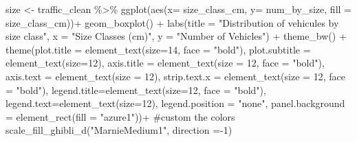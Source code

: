 \documentclass[
  10pt,
  letterpaper,
]{article}
\newenvironment{Shaded}{\begin{snugshade}}{\end{snugshade}}
\newcommand{\AttributeTok}[1]{\textcolor[rgb]{0.40,0.45,0.13}{#1}}
\newcommand{\CommentTok}[1]{\textcolor[rgb]{0.37,0.37,0.37}{#1}}
\newcommand{\DecValTok}[1]{\textcolor[rgb]{0.68,0.00,0.00}{#1}}
\newcommand{\FunctionTok}[1]{\textcolor[rgb]{0.28,0.35,0.67}{#1}}
\newcommand{\NormalTok}[1]{\textcolor[rgb]{0.00,0.23,0.31}{#1}}
\newcommand{\OtherTok}[1]{\textcolor[rgb]{0.00,0.23,0.31}{#1}}
\newcommand{\SpecialCharTok}[1]{\textcolor[rgb]{0.37,0.37,0.37}{#1}}
\newcommand{\StringTok}[1]{\textcolor[rgb]{0.13,0.47,0.30}{#1}}
\begin{document}
\begin{Shaded}
\begin{Highlighting}[]
\NormalTok{size }\OtherTok{\textless{}{-}}\NormalTok{ traffic\_clean }\SpecialCharTok{\%\textgreater{}\%} 
  \FunctionTok{ggplot}\NormalTok{(}\FunctionTok{aes}\NormalTok{(}\AttributeTok{x=}\NormalTok{ size\_class\_cm, }\AttributeTok{y=}\NormalTok{ num\_by\_size, }\AttributeTok{fill =}\NormalTok{ size\_class\_cm))}\SpecialCharTok{+}
  \FunctionTok{geom\_boxplot}\NormalTok{() }\SpecialCharTok{+}
  \FunctionTok{labs}\NormalTok{(}\AttributeTok{title =} \StringTok{"Distribution of vehicules by size class"}\NormalTok{,}
       \AttributeTok{x =} \StringTok{"Size Classes (cm)"}\NormalTok{,}
       \AttributeTok{y =} \StringTok{"Number of Vehicles"}\NormalTok{) }\SpecialCharTok{+}
  \FunctionTok{theme\_bw}\NormalTok{() }\SpecialCharTok{+} 
  \FunctionTok{theme}\NormalTok{(}\AttributeTok{plot.title =} \FunctionTok{element\_text}\NormalTok{(}\AttributeTok{size=}\DecValTok{14}\NormalTok{, }\AttributeTok{face =} \StringTok{"bold"}\NormalTok{), }
        \AttributeTok{plot.subtitle =} \FunctionTok{element\_text}\NormalTok{(}\AttributeTok{size=}\DecValTok{12}\NormalTok{),}
        \AttributeTok{axis.title =} \FunctionTok{element\_text}\NormalTok{(}\AttributeTok{size =} \DecValTok{12}\NormalTok{, }\AttributeTok{face =} \StringTok{"bold"}\NormalTok{),}
        \AttributeTok{axis.text =} \FunctionTok{element\_text}\NormalTok{(}\AttributeTok{size =} \DecValTok{12}\NormalTok{),}
        \AttributeTok{strip.text.x =} \FunctionTok{element\_text}\NormalTok{(}\AttributeTok{size =} \DecValTok{12}\NormalTok{, }\AttributeTok{face =} \StringTok{"bold"}\NormalTok{),}
        \AttributeTok{legend.title=}\FunctionTok{element\_text}\NormalTok{(}\AttributeTok{size=}\DecValTok{12}\NormalTok{, }\AttributeTok{face =} \StringTok{"bold"}\NormalTok{),}
        \AttributeTok{legend.text=}\FunctionTok{element\_text}\NormalTok{(}\AttributeTok{size=}\DecValTok{12}\NormalTok{),}
        \AttributeTok{legend.position =} \StringTok{"none"}\NormalTok{,}
        \AttributeTok{panel.background =} \FunctionTok{element\_rect}\NormalTok{(}\AttributeTok{fill =} \StringTok{"azure1"}\NormalTok{))}\SpecialCharTok{+}
  \CommentTok{\#custom the colors }
  \FunctionTok{scale\_fill\_ghibli\_d}\NormalTok{(}\StringTok{"MarnieMedium1"}\NormalTok{, }\AttributeTok{direction =}\SpecialCharTok{{-}}\DecValTok{1}\NormalTok{)}
\end{Highlighting}
\end{Shaded}
\end{document}
